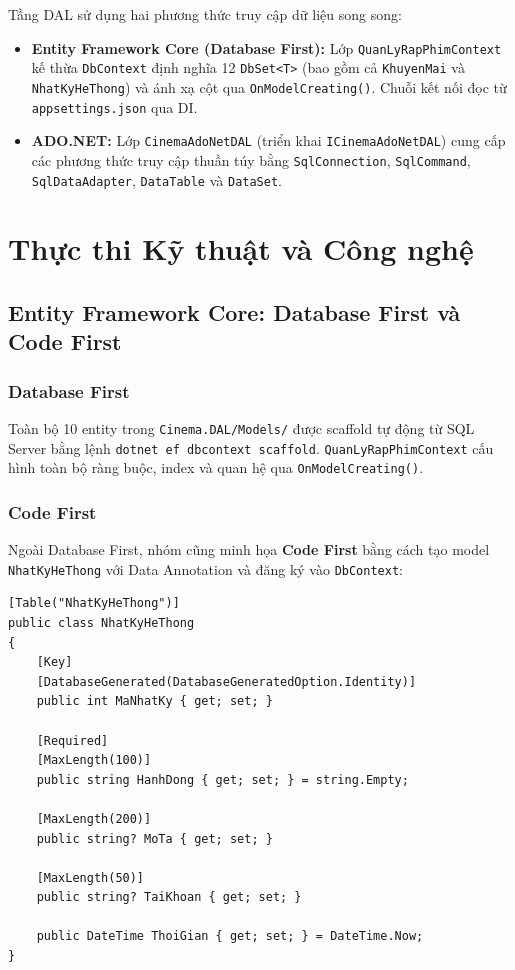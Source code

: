 \documentclass[12pt,a4paper,oneside]{book}
\theoremstyle{plain}
\numberwithin{equation}{chapter}
\begin{document}
\noindent Tầng DAL sử dụng hai phương thức truy cập dữ liệu song song:

\begin{itemize}
    \item \textbf{Entity Framework Core (Database First):} Lớp \texttt{QuanLyRapPhimContext} kế thừa \texttt{DbContext} định nghĩa 12 \texttt{DbSet<T>} (bao gồm cả \texttt{KhuyenMai} và \texttt{NhatKyHeThong}) và ánh xạ cột qua \texttt{OnModelCreating()}. Chuỗi kết nối đọc từ \texttt{appsettings.json} qua DI.
    \item \textbf{ADO.NET:} Lớp \texttt{CinemaAdoNetDAL} (triển khai \texttt{ICinemaAdoNetDAL}) cung cấp các phương thức truy cập thuần túy bằng \texttt{SqlConnection}, \texttt{SqlCommand}, \texttt{SqlDataAdapter}, \texttt{DataTable} và \texttt{DataSet}.
\end{itemize}

\chapter{Thực thi Kỹ thuật và Công nghệ}

\section{Entity Framework Core: Database First và Code First}\label{Sec4.1}

\subsection{Database First}\label{sub4.1.1}

\noindent Toàn bộ 10 entity trong \texttt{Cinema.DAL/Models/} được scaffold tự động từ SQL Server bằng lệnh \texttt{dotnet ef dbcontext scaffold}. \texttt{QuanLyRapPhimContext} cấu hình toàn bộ ràng buộc, index và quan hệ qua \texttt{OnModelCreating()}.

\subsection{Code First}\label{sub4.1.2}

\noindent Ngoài Database First, nhóm cũng minh họa \textbf{Code First} bằng cách tạo model \texttt{NhatKyHeThong} với Data Annotation và đăng ký vào \texttt{DbContext}:

\begin{lstlisting}[style=csharpstyle, caption={Model Code First -- \texttt{NhatKyHeThong.cs}}]
[Table("NhatKyHeThong")]
public class NhatKyHeThong
{
    [Key]
    [DatabaseGenerated(DatabaseGeneratedOption.Identity)]
    public int MaNhatKy { get; set; }

    [Required]
    [MaxLength(100)]
    public string HanhDong { get; set; } = string.Empty;

    [MaxLength(200)]
    public string? MoTa { get; set; }

    [MaxLength(50)]
    public string? TaiKhoan { get; set; }

    public DateTime ThoiGian { get; set; } = DateTime.Now;
}
\end{lstlisting}
\end{document}
